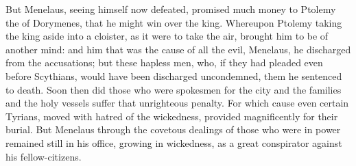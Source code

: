 {But Menelaus, seeing himself now defeated, promised much money to Ptolemy the
{} of Dorymenes, that he might win over the king.
Whereupon Ptolemy taking the king aside into a cloister, as it were to take the air, brought him to be of another mind:
and him that was the cause of all the evil, Menelaus, he discharged from the accusations; but these hapless men, who, if they had pleaded even before Scythians, would have been discharged uncondemned, them he sentenced to death.
Soon then did those who were spokesmen for the city and the families
{} and the holy vessels suffer that unrighteous penalty.
For which cause even certain Tyrians, moved with hatred of the wickedness, provided magnificently for their burial.
But Menelaus through the covetous dealings of those who were in power remained still in his office, growing in wickedness,
 as a great conspirator against his fellow-citizens.

}
